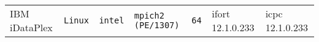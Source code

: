 \begin{longtable}{lllllll}
IBM iDataPlex         &\tt Linux  &\tt intel        &\tt mpich2 (PE/1307) &\tt 64           & ifort \footnotesize 12.1.0.233      & icpc \footnotesize 12.1.0.233   \\ %

\end{longtable}

